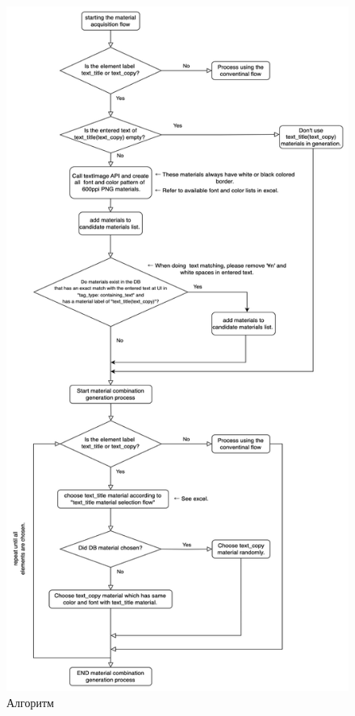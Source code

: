 \begin{figure}
	\centering
	\includegraphics[scale=0.6]{src/pictures/algorithm1.png}
	\caption{Алгоритм}
\end{figure}

